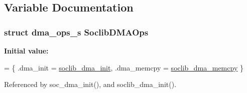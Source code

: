 \subsection{Variable Documentation}
\hypertarget{soclib-dma_8c_a80351df0b0525153b84f567f1d5c77d1}{
\subsubsection[{Soclib\-D\-M\-A\-Ops}]{\setlength{\rightskip}{0pt plus 5cm}struct {\bf dma\-\_\-ops\-\_\-s} Soclib\-D\-M\-A\-Ops}}\label{soclib-dma_8c_a80351df0b0525153b84f567f1d5c77d1}
{\bfseries Initial value\-:}
\begin{DoxyCode}
= \{
    .dma\_init = \hyperlink{soclib-dma_8c_a09eaa847325bb3b2a4962aba32aafe5f}{soclib\_dma\_init},
    .dma\_memcpy = \hyperlink{soclib-dma_8c_ab9abafb825a0f65decf1fef1cc920d40}{soclib\_dma\_memcpy}
\}
\end{DoxyCode}


Referenced by soc\-\_\-dma\-\_\-init(), and soclib\-\_\-dma\-\_\-init().

